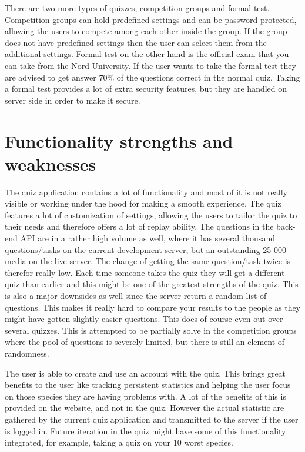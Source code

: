There are two more types of quizzes, competition groups and formal test. Competition groups can hold predefined settings and can be password protected, allowing the users to compete among each other inside the group. If the group does not have predefined settings then the user can select them from the additional settings. \newline
Formal test on the other hand is the official exam that you can take from the Nord University. If the user wants to take the formal test they are advised to get answer 70\% of the questions correct in the normal quiz. Taking a formal test provides a lot of extra security features, but they are handled on server side in order to make it secure. 


\section{Functionality strengths and weaknesses}
\label{sec:functstengwek}
The quiz application contains a lot of functionality and most of it is not really visible or working under the hood for making a smooth experience. The quiz features a lot of customization of settings, allowing the users to tailor the quiz to their needs and therefore offers a lot of replay ability. The questions in the back-end API are in a rather high volume as well, where it has several thousand questions/tasks on the current development server, but an outstanding 25 000 media on the live server. The change of getting the same question/task twice is therefor really low. Each time someone takes the quiz they will get a different quiz than earlier and this might be one of the greatest strengths of the quiz. This is also a major downsides as well since the server return a random list of questions. This makes it really hard to compare your results to the people as they might have gotten slightly easier questions. This does of course even out over several quizzes. This is attempted to be partially solve in the competition groups where the pool of questions is severely limited, but there is still an element of randomness.

The user is able to create and use an account with the quiz. This brings great benefits to the user like tracking persistent statistics and helping the user focus on those species they are having problems with. A lot of the benefits of this is provided on the website, and not in the quiz. However the actual statistic are gathered by the current quiz application and transmitted to the server if the user is logged in. Future iteration in the quiz might have some of this functionality integrated, for example, taking a quiz on your 10 worst species.

